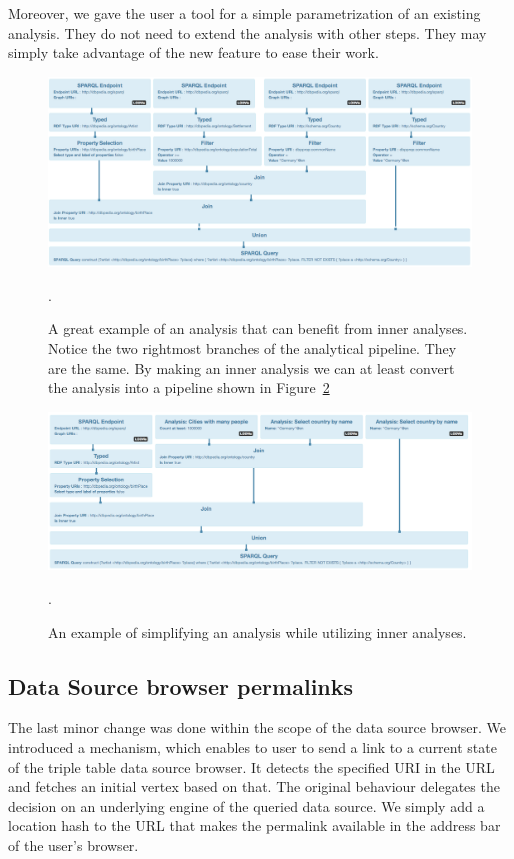 Moreover, we gave the user a tool for a simple parametrization of an existing analysis. 
They do not need to extend the analysis with other steps. They may simply take 
advantage of the new feature to ease their work.

\begin{figure}
	\centering
	\includegraphics[width=140mm]{img/inner-example.png}
	\caption{A great example of an analysis that can benefit from inner analyses. Notice the
	two rightmost branches of the analytical pipeline. They are the same. By making
	an inner analysis we can at least convert the analysis into a pipeline shown in 
	Figure~\ref{fig:inner-example-simpler}}.
	\label{fig:inner-example}
\end{figure}

\begin{figure}
	\centering
	\includegraphics[width=140mm]{img/inner-example-simpler.png}
	\caption{An example of simplifying an analysis while utilizing inner analyses.}.
	\label{fig:inner-example-simpler}
\end{figure}

\subsection{Data Source browser permalinks}
The last minor change was done within the scope of the data source browser.
We introduced a mechanism, which enables to user to send a link to a current 
state of the triple table data source browser. It detects the specified URI in 
the URL and fetches an initial vertex based on that. The original behaviour delegates 
the decision on an underlying engine of the queried data source. We simply add a 
location hash to the URL that makes the permalink available in the address bar 
of the user's browser.
